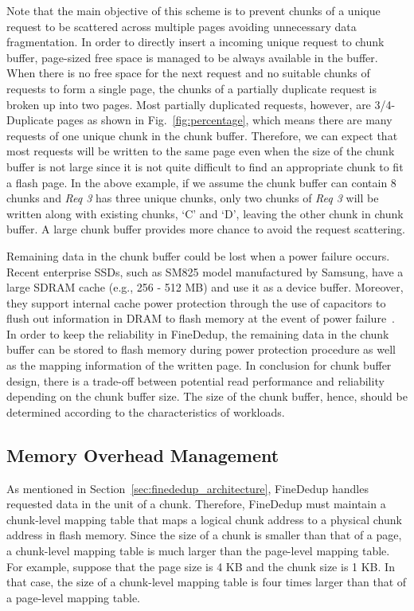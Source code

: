 Note that the main objective of this scheme is to prevent chunks of a unique request to be scattered across multiple pages 
avoiding unnecessary data fragmentation.
In order to directly insert a incoming unique request to chunk buffer,
page-sized free space is managed to be always available in the buffer.
When there is no free space for the next request and no suitable chunks of requests to form a single page,
the chunks of a partially duplicate request is broken up into two pages.
Most partially duplicated requests, however, are 3/4-Duplicate pages as shown in Fig.~\ref{fig:percentage}, which means 
there are many requests of one unique chunk in the chunk buffer.
Therefore, we can expect that most requests will be written to the same page even when the size of the chunk buffer is not large 
since it is not quite difficult to find an appropriate chunk to fit a flash page.
In the above example, if we assume the chunk buffer can contain 8 chunks and \textit{Req 3} has three unique chunks,
only two chunks of \textit{Req 3} will be written along with existing chunks, `C' and `D', leaving the other chunk in chunk buffer.
A large chunk buffer provides more chance to avoid the request scattering.


Remaining data in the chunk buffer could be lost when a power failure occurs.
Recent enterprise SSDs, such as SM825 model manufactured by Samsung, have a large SDRAM cache (e.g., 256 - 512 MB) and use it as a device buffer.
Moreover, they support internal cache power protection through the use of capacitors to flush out information in DRAM to flash memory 
at the event of power failure~\cite{sm825}.
In order to keep the reliability in FineDedup, the remaining data in the chunk buffer can be stored to flash memory 
during power protection procedure as well as the mapping information of the written page.
In conclusion for chunk buffer design, there is a trade-off between potential read performance 
and reliability depending on the chunk buffer size.
The size of the chunk buffer, hence, should be determined according to the characteristics of workloads.

\subsection{Memory Overhead Management}
\label{sec:finededup_memoryoverheadmanagement}

As mentioned in Section~\ref{sec:finededup_architecture},
FineDedup handles requested data in the unit of a chunk.
Therefore, FineDedup must maintain a chunk-level mapping table
that maps a logical chunk address to a physical chunk address in flash memory.
Since the size of a chunk is smaller than that of a page,
a chunk-level mapping table is much larger than the page-level mapping table.
For example, suppose that the page size is 4 KB and the chunk size is 1 KB.
In that case, the size of a chunk-level mapping table is four times larger than that of a page-level mapping table.

